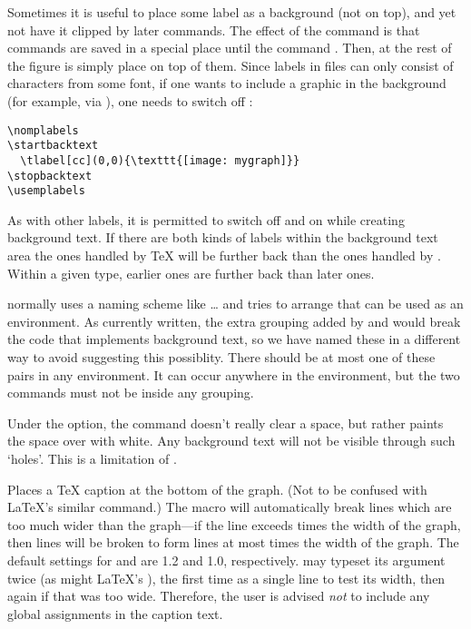 \documentclass[letterpaper]{article}
\begin{document}
Sometimes it is useful to place some label as a background (not on top),
and yet not have it clipped by later commands. The effect of the command
 is that  commands are saved in a special
place until the command . Then, at  the
rest of the figure is simply place on top of them. Since labels in \MP{}
files can only consist of characters from some font, if one wants to
include a graphic in the background (for example, via
), one needs to switch off :
\begin{verbatim}
\nomplabels
\startbacktext
  \tlabel[cc](0,0){\texttt{[image: mygraph]}}
\stopbacktext
\usemplabels
\end{verbatim}
As with other labels, it is permitted to switch  off and
on while creating background text. If there are both kinds of labels
within the background text area the ones handled by \TeX{} will be
further back than the ones handled by \MP{}. Within a given type,
earlier ones are further back than later ones.

\Mfp{} normally uses a naming scheme like  \dots {} and
tries to arrange that  can be used as an environment. As
currently written, the extra grouping added by  and
 would break the code that implements background text,
so we have named these in a different way to avoid suggesting this
possiblity. There should be at most one of these pairs in any
 environment. It can occur anywhere in the environment, but
the two commands must not be inside any grouping.

Under the  option, the  command doesn't really
clear a space, but rather paints the space over with white. Any
background text will not be visible through such `holes'. This is a
limitation of \MP{}.

\begin{cd}
%
\end{cd}

Places a \TeX{} caption at the bottom of the graph. (Not to be confused
with \LaTeX{}'s similar  command.) The macro will
automatically break lines which are too much wider than the graph---if
the  line exceeds  times the width of the
graph, then lines will be broken to form lines at most 
times the width of the graph. The default settings for  and
 are 1.2 and 1.0, respectively.  may typeset
its argument twice (as might \LaTeX{}'s ), the first time as
a single line to test its width, then again if that was too wide.
Therefore, the user is advised \emph{not} to include any global
assignments in the caption text.
\end{document}
